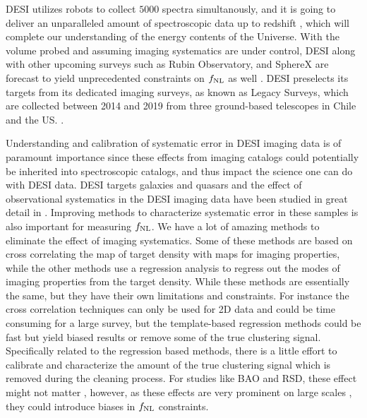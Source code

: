  DESI utilizes robots to collect $5000$ spectra simultanously, and it is going to deliver an unparalleled amount of spectroscopic data up to redshift , which will complete our understanding of the energy contents of the Universe. With the volume probed and assuming imaging systematics are under control, DESI along with other upcoming surveys such as Rubin Observatory, and SphereX are forecast to yield unprecedented constraints on $f_{\rm NL}$ as well . DESI preselects its targets from its dedicated imaging surveys, as known as Legacy Surveys, which are collected between 2014 and 2019 from three ground-based telescopes in Chile and the US. . 
 
 Understanding and calibration of systematic error in DESI imaging data is of paramount importance since these effects from imaging catalogs could potentially be inherited into spectroscopic catalogs, and thus impact the science one can do with DESI data. DESI targets galaxies and quasars and the effect of observational systematics in the DESI imaging data have been studied in great detail in . Improving methods to characterize systematic error in these samples is also important for measuring $f_{\rm NL}$. We have a lot of amazing methods to eliminate the effect of imaging systematics. Some of these methods are based on cross correlating the map of target density with maps for imaging properties, while the other methods use a regression analysis to regress out the modes of imaging properties from the target density. While these methods are essentially the same, but they have their own limitations and constraints. For instance the cross correlation techniques can only be used for 2D data and could be time consuming for a large survey, but the template-based regression methods could be fast but yield biased results or remove some of the true clustering signal. Specifically related to the regression based methods, there is a little effort to calibrate and characterize the amount of the true clustering signal which is removed during the cleaning process. For studies like BAO and RSD, these effect might not matter , however, as these effects are very prominent on large scales , they could introduce biases in $f_{\rm NL}$ constraints.  
 
